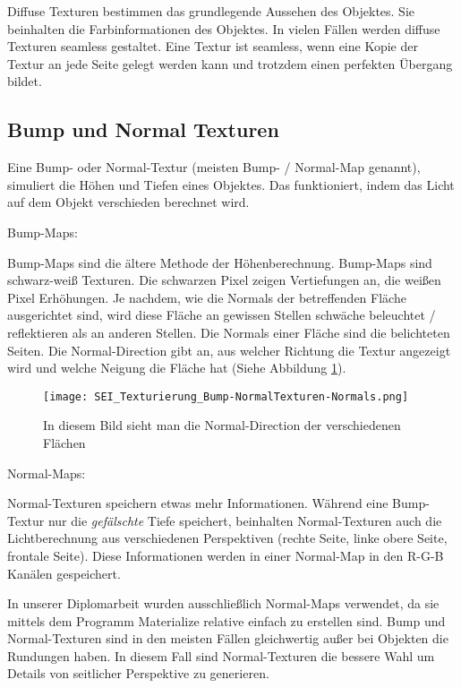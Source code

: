 Diffuse Texturen\citep{blender:tex_introduction} bestimmen das grundlegende Aussehen des Objektes. Sie beinhalten die Farbinformationen des
Objektes.
In vielen Fällen werden diffuse Texturen seamless gestaltet. Eine Textur ist seamless, wenn eine Kopie der Textur an
jede Seite gelegt werden kann und trotzdem einen perfekten Übergang bildet.

\subsection{Bump und Normal Texturen}
\label{sec:tex_normal}

Eine Bump- oder Normal-Textur (meisten Bump- / Normal-Map genannt), simuliert die Höhen und Tiefen eines Objektes.
Das funktioniert, indem das Licht auf dem Objekt verschieden berechnet wird.\citep{unity:normal_vs_bump}


Bump-Maps:

Bump-Maps sind die ältere Methode der Höhenberechnung. Bump-Maps sind schwarz-weiß Texturen. Die schwarzen Pixel
zeigen Vertiefungen an, die weißen Pixel Erhöhungen. Je nachdem, wie die Normals der betreffenden Fläche ausgerichtet
sind, wird diese Fläche an gewissen Stellen schwäche beleuchtet / reflektieren als an anderen Stellen. Die Normals
einer Fläche sind die belichteten Seiten. Die Normal-Direction gibt an, aus welcher Richtung die Textur angezeigt
wird und welche Neigung die Fläche hat (Siehe Abbildung \ref{picture:normals}).

\begin{figure}[h]
    \centering
    \texttt{[image: SEI\_Texturierung\_Bump-NormalTexturen-Normals.png]}
    \caption{In diesem Bild sieht man die Normal-Direction der verschiedenen Flächen}
    \label{picture:normals}
\end{figure}


Normal-Maps:

Normal-Texturen speichern etwas mehr Informationen. Während eine Bump-Textur nur die \textit{gefälschte} Tiefe
speichert, beinhalten Normal-Texturen auch die Lichtberechnung aus verschiedenen Perspektiven (rechte Seite,
linke obere Seite, frontale Seite). Diese Informationen werden in einer Normal-Map in den R-G-B Kanälen gespeichert.

In unserer Diplomarbeit wurden ausschließlich Normal-Maps verwendet, da sie mittels dem Programm
Materialize\citep{bbs:materialize} relative einfach zu erstellen sind. Bump und Normal-Texturen sind in den meisten
Fällen gleichwertig außer bei Objekten die Rundungen haben. In diesem Fall sind Normal-Texturen die bessere Wahl
um Details von seitlicher Perspektive zu generieren.

